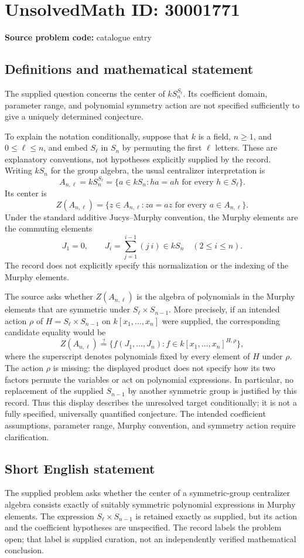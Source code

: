 \documentclass[11pt]{article}
\begin{document}
\section*{UnsolvedMath ID: 30001771}
\textbf{Source problem code:} catalogue entry
\subsection{Definitions and mathematical statement}
The supplied question concerns the center of \(kS_n^{S_\ell}\). Its coefficient domain, parameter range, and polynomial symmetry action are not specified sufficiently to give a uniquely determined conjecture.

To explain the notation conditionally, suppose that \(k\) is a field, \(n\geq 1\), and \(0\leq\ell\leq n\), and embed \(S_\ell\) in \(S_n\) by permuting the first \(\ell\) letters. These are explanatory conventions, not hypotheses explicitly supplied by the record. Writing \(kS_n\) for the group algebra, the usual centralizer interpretation is
\[
A_{n,\ell}=kS_n^{S_\ell}
=\{a\in kS_n:ha=ah\text{ for every }h\in S_\ell\}.
\]
Its center is
\[
Z(A_{n,\ell})=\{z\in A_{n,\ell}:za=az\text{ for every }a\in A_{n,\ell}\}.
\]
Under the standard additive Jucys--Murphy convention, the Murphy elements are the commuting elements
\[
J_1=0,\qquad J_i=\sum_{j=1}^{i-1}(j\ i)\in kS_n\quad(2\leq i\leq n).
\]
The record does not explicitly specify this normalization or the indexing of the Murphy elements.

The source asks whether \(Z(A_{n,\ell})\) is the algebra of polynomials in the Murphy elements that are symmetric under \(S_\ell\times S_{n-1}\). More precisely, if an intended action \(\rho\) of
\(H=S_\ell\times S_{n-1}\) on \(k[x_1,\ldots,x_n]\) were supplied, the corresponding candidate equality would be
\[
Z(A_{n,\ell})\stackrel{?}{=}
\{f(J_1,\ldots,J_n):f\in k[x_1,\ldots,x_n]^{H,\rho}\},
\]
where the superscript denotes polynomials fixed by every element of \(H\) under \(\rho\). The action \(\rho\) is missing: the displayed product does not specify how its two factors permute the variables or act on polynomial expressions. In particular, no replacement of the supplied \(S_{n-1}\) by another symmetric group is justified by this record. Thus this display describes the unresolved target conditionally; it is not a fully specified, universally quantified conjecture. The intended coefficient assumptions, parameter range, Murphy convention, and symmetry action require clarification.
\subsection{Short English statement}
The supplied problem asks whether the center of a symmetric-group centralizer algebra consists exactly of suitably symmetric polynomial expressions in Murphy elements. The expression \(S_\ell\times S_{n-1}\) is retained exactly as supplied, but its action and the coefficient hypotheses are unspecified. The record labels the problem open; that label is supplied curation, not an independently verified mathematical conclusion.
\end{document}
